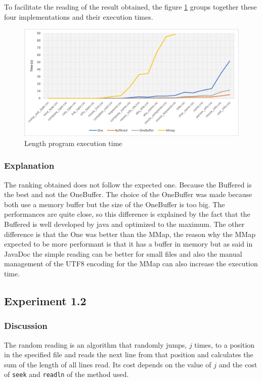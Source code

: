 \documentclass[12pt]{article}
\begin{document}
To facilitate the reading of the result obtained, the figure \ref{fig:3} groups together these four implementations and their execution times.

\begin{figure}[H] 
\begin{adjustwidth}{-3cm}{-1cm}
 \begin{center}
\includegraphics[width=20cm]{images/length.png}
\end{center}
\caption{Length program execution time}
\label{fig:3}
\end{adjustwidth}
\end{figure}
\subsubsection{Explanation}
The ranking obtained does not follow the expected one. Because the Buffered is the best and not the OneBuffer. The choice of the OneBuffer was made because both use a memory buffer but the size of the OneBuffer is too big. The performances are quite close, so this difference is explained by the fact that the Buffered is well developed by java and optimized to the maximum. The other difference is that the One was better than the MMap, the reason why the MMap expected to be more performant is that it has a buffer in memory but as said in JavaDoc the simple reading can be better for small files and also the manual management of the UTF8 encoding for the MMap can also increase the execution time.
\subsection{Experiment 1.2} \label{exp1.2}
\subsubsection{Discussion}
The random reading is an algorithm that randomly jumps, $j$ times, to a position in the specified file and reads the next line from that position and calculates the sum of the length of all lines read.  Its cost depends on the value of $j$ and the cost of \texttt{seek} and \texttt{readln} of the method used.
\end{document}
